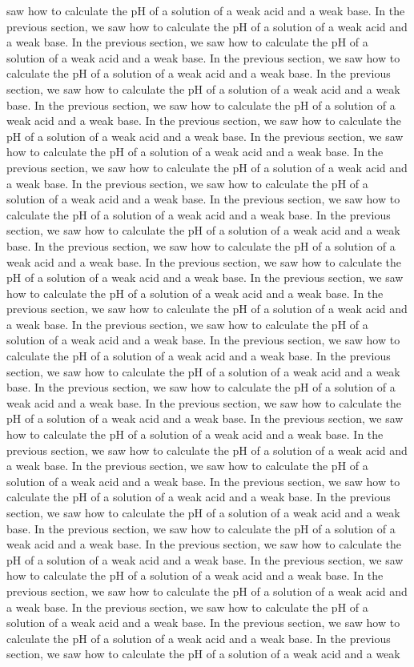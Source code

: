 \documentclass[11pt]{article}
\begin{document}
saw how to calculate the pH of a solution of a weak acid and a weak base. In the previous section, we saw how to calculate the pH of a solution of a weak acid and a weak base. In the previous section, we saw how to calculate the pH of a solution of a weak acid and a weak base. In the previous section, we saw how to calculate the pH of a solution of a weak acid and a weak base. In the previous section, we saw how to calculate the pH of a solution of a weak acid and a weak base. In the previous section, we saw how to calculate the pH of a solution of a weak acid and a weak base. In the previous section, we saw how to calculate the pH of a solution of a weak acid and a weak base. In the previous section, we saw how to calculate the pH of a solution of a weak acid and a weak base. In the previous section, we saw how to calculate the pH of a solution of a weak acid and a weak base. In the previous section, we saw how to calculate the pH of a solution of a weak acid and a weak base. In the previous section, we saw how to calculate the pH of a solution of a weak acid and a weak base. In the previous section, we saw how to calculate the pH of a solution of a weak acid and a weak base. In the previous section, we saw how to calculate the pH of a solution of a weak acid and a weak base. In the previous section, we saw how to calculate the pH of a solution of a weak acid and a weak base. In the previous section, we saw how to calculate the pH of a solution of a weak acid and a weak base. In the previous section, we saw how to calculate the pH of a solution of a weak acid and a weak base. In the previous section, we saw how to calculate the pH of a solution of a weak acid and a weak base. In the previous section, we saw how to calculate the pH of a solution of a weak acid and a weak base. In the previous section, we saw how to calculate the pH of a solution of a weak acid and a weak base. In the previous section, we saw how to calculate the pH of a solution of a weak acid and a weak base. In the previous section, we saw how to calculate the pH of a solution of a weak acid and a weak base. In the previous section, we saw how to calculate the pH of a solution of a weak acid and a weak base. In the previous section, we saw how to calculate the pH of a solution of a weak acid and a weak base. In the previous section, we saw how to calculate the pH of a solution of a weak acid and a weak base. In the previous section, we saw how to calculate the pH of a solution of a weak acid and a weak base. In the previous section, we saw how to calculate the pH of a solution of a weak acid and a weak base. In the previous section, we saw how to calculate the pH of a solution of a weak acid and a weak base. In the previous section, we saw how to calculate the pH of a solution of a weak acid and a weak base. In the previous section, we saw how to calculate the pH of a solution of a weak acid and a weak base. In the previous section, we saw how to calculate the pH of a solution of a weak acid and a weak base. In the previous section, we saw how to calculate the pH of a solution of a weak acid and a weak base. In the previous section, we saw how to calculate the pH of a solution of a weak acid and a weak base. In the previous section, we saw how to calculate the pH of a solution of a weak acid and a weak 
\end{document}
